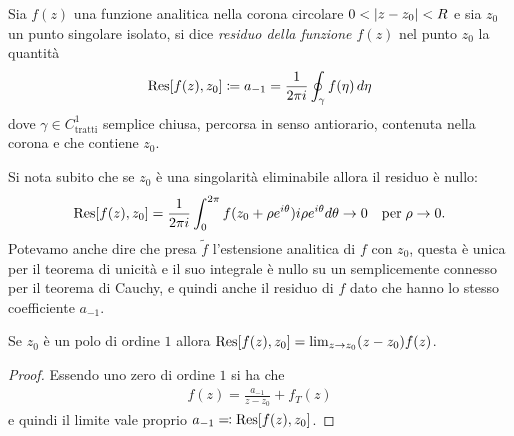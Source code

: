 \begin{definition}[ Residuo ]
  Sia $ f(z) $ una funzione analitica nella corona circolare $ 0 < \left|{z - z_0}\right| < R $ e sia $ z_0 $ un punto singolare isolato, 
  si dice \textit{residuo della funzione $ f(z) $} nel punto $ z_0 $ la quantità 
  \begin{align}
    \operatorname{\textnormal{Res}}[f(z), z_0] \coloneq a_{-1} = \frac1{2\pi i} \oint_\gamma f(\eta) \,d\eta
  \end{align}
  dove $ \gamma \in C^1_{\text{tratti}} $  semplice chiusa, percorsa in senso antiorario, contenuta nella corona e che contiene $ z_0 $.
\end{definition}

Si nota subito che se $ z_0 $ è una singolarità eliminabile allora il residuo è nullo:
\begin{align}
  \operatorname{\textnormal{Res}}[ f(z), z_0 ] = \frac1{2\pi i} \int_0^{2\pi} f(z_0 + \rho e^{i\theta}) i \rho e^{i\theta} d\theta \to 0 \quad \textnormal{per}\; \rho \to 0.
\end{align}
Potevamo anche dire che presa $ \tilde{f} $ l'estensione analitica di $ f $ con $ z_0 $, questa è unica per il teorema di unicità e il suo integrale 
è nullo su un semplicemente connesso per il teorema di Cauchy, e quindi anche il residuo di $ f $ dato che hanno lo stesso coefficiente $ a_{-1} $.

\begin{theorem}[  ]
  Se $ z_0 $ è un polo di ordine $ 1 $ allora $ \operatorname{\textnormal{Res}}[ f(z), z_0 ] = \lim_{z \to z_0} (z - z_0) f(z) $.
\end{theorem}
\begin{proof}
  Essendo uno zero di ordine $ 1 $ si ha che 
  \begin{align}
    f(z) = \frac{a_{-1}}{z - z_0} + f_T(z)
  \end{align}
  e quindi il limite vale proprio $ a_{-1} \eqcolon \operatorname{\textnormal{Res}}[ f(z), z_0 ] $.
\end{proof}

